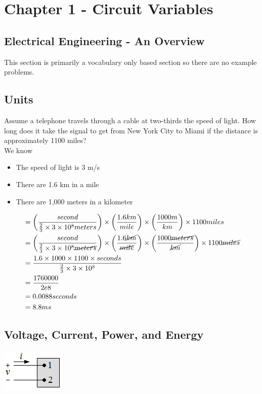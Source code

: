 \section{Chapter 1 - Circuit Variables}

\subsection{Electrical Engineering - An Overview}

This section is primarily a vocabulary only based section so there are no example problems.

\subsection{Units}

Assume a telephone travels through a cable at two-thirds the speed of light.
How long does it take the signal to get from New York City to Miami if the distance is
approximately 1100 miles? \\We know

\begin{itemize}
	\item The speed of light is 3 m/s
	\item There are 1.6 km in a mile
	\item There are 1,000 meters in a kilometer
\end{itemize}

\begin{align*}
	&= \left(\frac{second}{\frac{2}{3}\times 3\times 10^{8} meters}\right)\times \left(\frac{1.6 km}{mile}\right) \times \left(\frac{1000 m}{km}\right) \times 1100 miles
	\\ &= \left(\frac{second}{\frac{2}{3}\times 3\times 10^{8} \cancel{meters}}\right) \times \left(\frac{1.6 \cancel{km}}{\cancel{mile}}\right) \times \left(\frac{1000 \cancel{meters}}{\cancel{km}}\right) \times 1100 \cancel{miles}
	\\ &= \frac{1.6 \times 1000 \times 1100 \times seconds}{\frac{2}{3} \times 3\times 10^{8}}
	\\ &= \frac{1760000}{2e{8}}
	\\ &= 0.0088 seconds
	\\ &= 8.8 ms
\end{align*}

\newpage
\subsection{Voltage, Current, Power, and Energy}
\includegraphics{img/c1/idealbasiccircuit}

